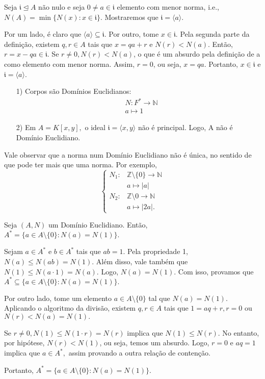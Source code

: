 \documentclass[algebraII_notes.tex]{subfiles}
\begin{document}
\begin{proof*}
	Seja \(\mathfrak{i} \trianglelefteq{A}\) não nulo e seja \(0\neq a\in \mathfrak{i}\) elemento com
	menor norma, i.e., \(N(A) = \min\{N(x): x\in \mathfrak{i}\}\). Mostraremos que \(\mathfrak{i} = \langle a \rangle\).

	Por um lado, é claro que \(\langle a \rangle \subseteq{\mathfrak{i}}.\) Por outro, tome \(x\in \mathfrak{i}\).
	Pela segunda parte da definição, existem \(q, r\in A\) tais que \( x = qa + r\) e \(N(r) < N(a).\)
	Então, \(r=x-qa\in \mathfrak{i}.\) Se \(r\neq0, N(r) < N(a)\), o que é um absurdo pela definição de a como
	elemento com menor norma. Assim, \(r=0\), ou seja, \(x = qa\). Portanto, \(x\in \mathfrak{i}\) e \(\mathfrak{i} = \langle a \rangle\). \qedsymbol
\end{proof*}
\begin{example}
	\begin{itemize}
		\item[1)] Corpos são Domínios Euclidianos:
		      \begin{align*}
			       & N:F^{*}\rightarrow \mathbb{N} \\
			       & a\mapsto 1
		      \end{align*}
		\item[2)] Em \(A = K[x, y],\) o ideal \(\mathfrak{i} = \langle x, y \rangle\) não é principal. Logo, A não é Domínio Euclidiano.
	\end{itemize}
\end{example}
Vale observar que a norma num Domínio Euclidiano não é única, no sentido de que pode ter mais que uma norma. Por exemplo,
\[
	\left\{\begin{array}{ll}
		N_{1}: & \mathbb{Z}\setminus{\{0\}}\rightarrow \mathbb{N} \\
		       & a\mapsto |a|                                     \\
		N_{2}: & \mathbb{Z}\setminus{0}\rightarrow \mathbb{N}     \\
		       & a\mapsto |2a|.
	\end{array}\right.
\]
\begin{prop*}
	Seja \((A, N)\) um Domínio Euclidiano. Então, \(A^{*}=\{a\in A\setminus{\{0\}}: N(a) = N(1)\}.\)
\end{prop*}
\begin{proof*}
	Sejam \(a\in A^{*}\) e \(b\in A^{*}\) tais que \(ab = 1.\) Pela propriedade 1,
	\(N(a)\leq N(ab) = N(1).\) Além disso, vale também que \(N(1)\leq N(a \cdot 1) = N(a).\) Logo,
	\(N(a) = N(1).\) Com isso, provamos que \(A^{*}\subseteq{\{a\in A\setminus{\{0\}}: N(a) = N(1)\}}.\)

	Por outro lado, tome um elemento \(a\in A\setminus{\{0\}}\) tal que \(N(a) = N(1).\) Aplicando o algoritmo da divisão,
	existem \(q, r\in A\) tais que \(1 = aq + r, r = 0\) ou \(N(r) < N(a) = N(1).\)

	Se \(r\neq0, N(1)\leq N(1 \cdot r) = N(r)\) implica que \(N(1)\leq N(r).\) No entanto, por hipótese,
	\(N(r) < N(1)\), ou seja, temos um absurdo. Logo, \(r = 0\) e \(aq = 1\) implica que \(a\in A^{*},\) assim provando
	a outra relação de contenção.

	Portanto, \(A^{*}=\{a\in A\setminus{\{0\}}: N(a) = N(1)\}.\) \qedsymbol
\end{proof*}
\end{document}
